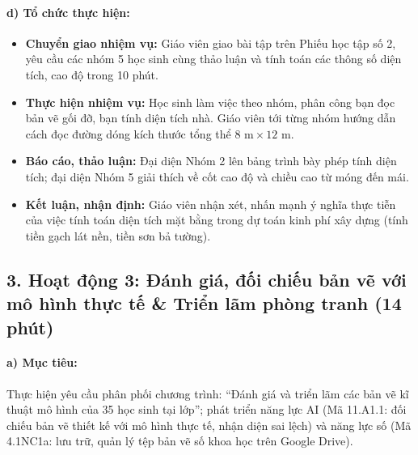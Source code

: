 \documentclass[12pt, a4paper]{article}
\begin{document}
\paragraph{d) Tổ chức thực hiện:}
\begin{itemize}[leftmargin=0.8cm]
    \item \textbf{Chuyển giao nhiệm vụ:} Giáo viên giao bài tập trên Phiếu học tập số 2, yêu cầu các nhóm 5 học sinh cùng thảo luận và tính toán các thông số diện tích, cao độ trong 10 phút.
    \item \textbf{Thực hiện nhiệm vụ:} Học sinh làm việc theo nhóm, phân công bạn đọc bản vẽ gối đỡ, bạn tính diện tích nhà. Giáo viên tới từng nhóm hướng dẫn cách đọc đường dóng kích thước tổng thể $8\text{ m} \times 12\text{ m}$.
    \item \textbf{Báo cáo, thảo luận:} Đại diện Nhóm 2 lên bảng trình bày phép tính diện tích; đại diện Nhóm 5 giải thích về cốt cao độ và chiều cao từ móng đến mái.
    \item \textbf{Kết luận, nhận định:} Giáo viên nhận xét, nhấn mạnh ý nghĩa thực tiễn của việc tính toán diện tích mặt bằng trong dự toán kinh phí xây dựng (tính tiền gạch lát nền, tiền sơn bả tường).
\end{itemize}

\subsection*{3. Hoạt động 3: Đánh giá, đối chiếu bản vẽ với mô hình thực tế \& Triển lãm phòng tranh (14 phút)}

\paragraph{a) Mục tiêu:} Thực hiện yêu cầu phân phối chương trình: ``Đánh giá và triển lãm các bản vẽ kĩ thuật mô hình của 35 học sinh tại lớp''; phát triển năng lực AI (Mã 11.A1.1: đối chiếu bản vẽ thiết kế với mô hình thực tế, nhận diện sai lệch) và năng lực số (Mã 4.1NC1a: lưu trữ, quản lý tệp bản vẽ số khoa học trên Google Drive).
\end{document}
